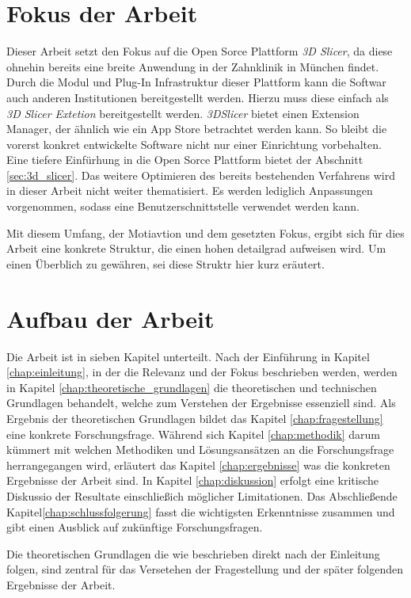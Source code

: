 \section{Fokus der Arbeit}
\label{sec:fokus_der-arbeit} Dieser Arbeit setzt den Fokus auf die Open Sorce Plattform
\textit{3D Slicer}, da diese ohnehin bereits eine breite Anwendung in der Zahnklinik
in München findet. Durch die Modul und Plug-In Infrastruktur dieser Plattform
kann die Softwar auch anderen Institutionen bereitgestellt werden. Hierzu muss diese
einfach als \textit{3D Slicer Extetion} bereitgestellt werden. \textit{3DSlicer}
bietet einen Extension Manager, der ähnlich wie ein App Store betrachtet werden kann.
So bleibt die vorerst konkret entwickelte Software nicht nur einer Einrichtung
vorbehalten. Eine tiefere Einfürhung in die Open Sorce Plattform bietet der Abschnitt
\ref{sec:3d_slicer}. Das weitere Optimieren des bereits bestehenden Verfahrens
wird in dieser Arbeit nicht weiter thematisiert. Es werden lediglich Anpassungen
vorgenommen, sodass eine Benutzerschnittstelle verwendet werden kann.

Mit diesem Umfang, der Motiavtion und dem gesetzten Fokus, ergibt sich für dies
Arbeit eine konkrete Struktur, die einen hohen detailgrad aufweisen wird. Um
einen Überblich zu gewähren, sei diese Struktr hier kurz eräutert.

\section{Aufbau der Arbeit}
\label{sec:aufbau_der_arbeit} Die Arbeit ist in sieben Kapitel unterteilt. Nach
der Einführung in Kapitel \ref{chap:einleitung}, in der die Relevanz und der Fokus
beschrieben werden, werden in Kapitel \ref{chap:theoretische_grundlagen} die
theoretischen und technischen Grundlagen behandelt, welche zum Verstehen der Ergebnisse
essenziell sind. Als Ergebnis der theoretischen Grundlagen bildet das Kapitel
\ref{chap:fragestellung} eine konkrete Forschungsfrage. Während sich Kapitel \ref{chap:methodik}
darum kümmert mit welchen Methodiken und Lösungsansätzen an die Forschungsfrage herrangegangen
wird, erläutert das Kapitel \ref{chap:ergebnisse} was die konkreten Ergebnisse
der Arbeit sind. In Kapitel \ref{chap:diskussion} erfolgt eine kritische Diskussio
der Resultate einschließich möglicher Limitationen. Das Abschließende Kapitel\ref{chap:schlussfolgerung}
fasst die wichtigsten Erkenntnisse zusammen und gibt einen Ausblick auf zukünftige
Forschungsfragen.

Die theoretischen Grundlagen die wie beschrieben direkt nach der Einleitung folgen,
sind zentral für das Versetehen der Fragestellung und der später folgenden
Ergebnisse der Arbeit.
